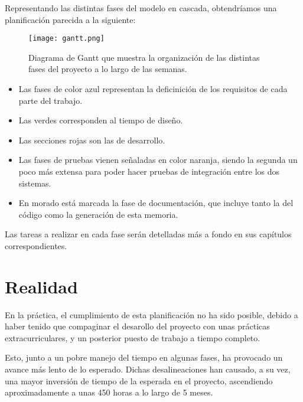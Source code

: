Representando las distintas fases del modelo en cascada, obtendríamos una planificación parecida a la siguiente:

\begin{figure}[ht]
	\centering
	\texttt{[image: gantt.png]}
	\caption{Diagrama de Gantt que muestra la organización de las distintas fases del proyecto a lo largo de las semanas.}
\end{figure}

\begin{itemize}
    \item Las fases de color azul representan la deficinición de los requisitos de cada parte del trabajo.
    \item Las verdes corresponden al tiempo de diseño.
    \item Las secciones rojas son las de desarrollo.
    \item Las fases de pruebas vienen señaladas en color naranja, siendo la segunda un poco más extensa para poder hacer pruebas de integración entre los dos sistemas.
    \item En morado está marcada la fase de documentación, que incluye tanto la del código como la generación de esta memoria.
\end{itemize}

Las tareas a realizar en cada fase serán detelladas más a fondo en sus capítulos correspondientes.

\section{Realidad}

En la práctica, el cumplimiento de esta planificación no ha sido posible, debido a haber tenido que compaginar el desarollo del proyecto con unas prácticas extracurriculares, y un posterior puesto de trabajo a tiempo completo.

Esto, junto a un pobre manejo del tiempo en algunas fases, ha provocado un avance más lento de lo esperado. Dichas desalineaciones han causado, a su vez, una mayor inversión de tiempo de la esperada en el proyecto, ascendiendo aproximadamente a unas 450 horas a lo largo de 5 meses.
